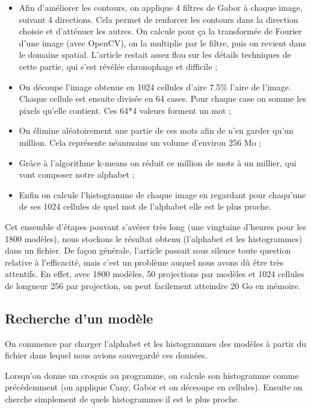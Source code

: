 \documentclass[12pt, a4paper, oneside]{article}
\begin{document}
\begin{itemize}
    \item Afin d'améliorer les contours, on applique 4 filtres de Gabor à chaque image, suivant 4 directions.
    Cela permet de renforcer les contours dans la direction choisie et d'atténuer les autres.
    On calcule pour ça la transformée de Fourier d'une image (avec OpenCV), on la multiplie par le filtre, puis on revient dans le domaine spatial.
    L'article restait assez flou sur les détails techniques de cette partie, qui s'est révélée chronophage et difficile ;
    \item On découpe l'image obtenue en \num{1024} cellules d'aire \num{7,5}\% l'aire de l'image.
    Chaque cellule est ensuite divisée en 64 cases.
    Pour chaque case on somme les pixels qu'elle contient.
    Ces 64*4 valeurs forment un mot ;
    \item On élimine aléatoirement une partie de ces mots afin de n'en garder qu'un million.
    Cela représente néanmoins un volume d'environ \num{256} Mo ;
    \item Grâce à l'algorithme k-means on réduit ce million de mots à un millier, qui vont composer notre alphabet ;
    \item Enfin on calcule l'histogramme de chaque image en regardant pour chaqu'une de ses \num{1024} cellules de quel mot de l'alphabet elle est le plus proche.
\end{itemize}


Cet ensemble d'étapes pouvant s'avérer très long (une vingtaine d'heures pour les \num{1800} modèles), nous stockons le résultat obtenu (l'alphabet et les histogrammes) dans un fichier.
De façon générale, l'article passait sous silence toute question relative à l'efficacité, mais c'est un problème auquel nous avons dû être très attentifs.
En effet, avec \num{1800} modèles, 50 projections par modèles et \num{1024} cellules de longueur 256 par projection, on peut facilement atteindre 20 Go en mémoire.


\subsection{Recherche d'un modèle}
\label{sub:Recherche d'un modèle}

On commence par charger l'alphabet et les histogrammes des modèles à partir du fichier dans lequel nous avions sauvegardé ces données.

Lorsqu'on donne un croquis au programme, on calcule son histogramme comme précédemment (on applique Cany, Gabor et on déceoupe en cellules).
Ensuite on cherche simplement de quels histogrammes il est le plus proche.
\end{document}
